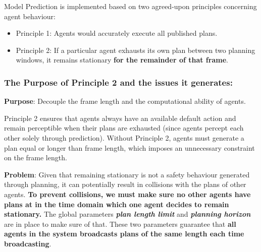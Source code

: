 Model Prediction is implemented based on two agreed-upon principles concerning agent behaviour:
\begin{itemize}
    \item Principle 1: Agents would accurately execute all published plans.
    \item Principle 2: If a particular agent exhausts its own plan between two planning windows, it remains stationary \textbf{for the remainder of that frame}.
\end{itemize}

\subsubsection{The Purpose of Principle 2 and the issues it generates:}

\textbf{Purpose}: Decouple the frame length and the computational ability of agents. 

    Principle 2 ensures that agents always have an available default action and remain perceptible when their plans are exhausted (since agents percept each other solely through prediction). Without Principle 2, agents must generate a plan equal or longer than frame length, which imposes an unnecessary constraint on the frame length.

\textbf{Problem}: 
    Given that remaining stationary is not a safety behaviour generated through planning, it can potentially result in collisions with the plans of other agents.
    \textbf{To prevent collisions, we must make sure no other agents have plans at in the time domain which one agent decides to remain stationary.}
    The global parameters \textit{\textbf{plan length limit}} and \textit{\textbf{planning horizon}} are in place to make sure of that. These two parameters guarantee that \textbf{all agents in the system broadcasts plans of the same length each time broadcasting}.
    
